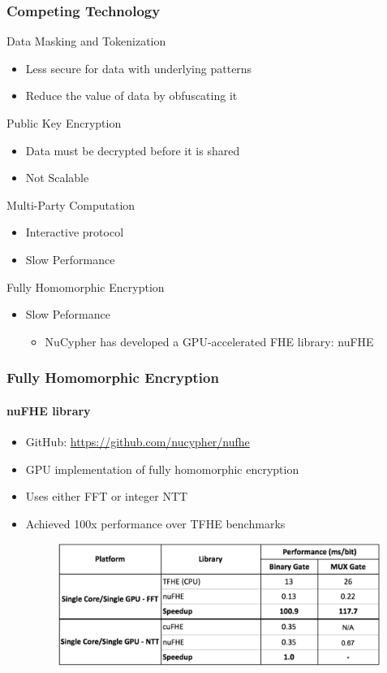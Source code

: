 \documentclass[xetex,mathsans,sans,aspectratio=169]{beamer}
\begin{document}
    \begin{frame}
      \frametitle{Competing Technology}
       Data Masking and Tokenization
       \begin{itemize}
           \item Less secure for data with underlying patterns
           \item Reduce the value of data by obfuscating it
       \end{itemize}

       Public Key Encryption
       \begin{itemize}
           \item Data must be decrypted before it is shared
           \item Not Scalable
       \end{itemize}

       Multi-Party Computation
       \begin{itemize}
           \item Interactive protocol
           \item Slow Performance
       \end{itemize}

       Fully Homomorphic Encryption
       \begin{itemize}
           \item Slow Peformance
           \begin{itemize}
               \item NuCypher has developed a GPU-accelerated FHE library: nuFHE
           \end{itemize}
       \end{itemize}
     \end{frame}

    \begin{frame}
      \frametitle{Fully Homomorphic Encryption}
       \framesubtitle{nuFHE library}
       \begin{itemize}
           \item GitHub: \url{https://github.com/nucypher/nufhe}
           \item GPU implementation of fully homomorphic encryption
           \item Uses either FFT or integer NTT
           \item Achieved 100x performance over TFHE benchmarks
           \begin{figure}
               \includegraphics[width=10.5cm]{pdf/nufhe-benchmarks.pdf}
           \end{figure}
       \end{itemize}
     \end{frame}
\end{document}
